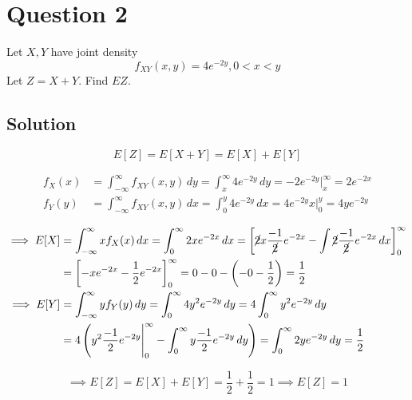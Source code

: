 \section*{Question 2}

Let \( X, Y \) have joint density
\[
    f_{X Y}(x, y)=4 e^{-2 y}, 0<x<y
\]
Let \( Z=X+Y \).
Find \( E Z \).

\subsection*{Solution}

\begin{equation*}
    E[Z]
    =
    E[X+Y]
    =
    E[X] + E[Y]
\end{equation*}

\begin{align*}
    f_X (x)
     & =
    \int_{-\infty}^{\infty} f_{X Y}(x, y) \, dy
    =
    \int_{x}^{\infty} 4 e^{-2 y} \, dy
    =
    -2 e^{-2 y} \Big|_{x}^{\infty}
    =
    2 e^{-2 x}
    \\
    f_Y (y)
     & =
    \int_{-\infty}^{\infty} f_{X Y}(x, y) \, dx
    =
    \int_{0}^{y} 4 e^{-2 y} \, dx
    =
    4 e^{-2 y} x \Big|_{0}^{y}
    =
    4 y e^{-2 y}
\end{align*}

\begin{align*}
    \implies
    E[X]
     & =
    \int_{-\infty}^{\infty} x f_X(x) \, dx
    =
    \int_{0}^{\infty} 2 x e^{-2 x} \, dx
        =
        {\left[
                \cancel{2} x \frac{-1}{\cancel{2}} e^{-2 x}
                -
                \int \cancel{2} \frac{-1}{\cancel{2}} e^{-2 x} \, dx
                \right]}_{0}^{\infty}
    \\ & =
    {\left[
        -x e^{-2 x}
        -
        \frac{1}{2} e^{-2 x}
        \right]}_{0}^{\infty}
    =
    0 - 0 - \left( -0 - \frac{1}{2} \right)
    =
    \frac{1}{2}
    \\
    \implies
    E[Y]
     & =
    \int_{-\infty}^{\infty} y f_Y(y) \, dy
    =
    \int_{0}^{\infty} 4 y^2 e^{-2 y} \, dy
    =
    4 \int_{0}^{\infty} y^2 e^{-2 y} \, dy
    \\ & =
    4 \left(
    y^2 \frac{-1}{2} e^{-2 y} \Bigg|_{0}^{\infty}
    - \int_{0}^{\infty} y \frac{-1}{2} e^{-2 y} \, dy
    \right)
    =
    \int_{0}^{\infty} 2y e^{-2 y} \, dy
    =
    \frac{1}{2}
\end{align*}

\begin{equation*}
    \implies
    E[Z]
    =
    E[X] + E[Y]
    =
    \frac{1}{2} + \frac{1}{2}
    =
    1
    \implies
    \boxed{
        E[Z] = 1
    }
\end{equation*}
